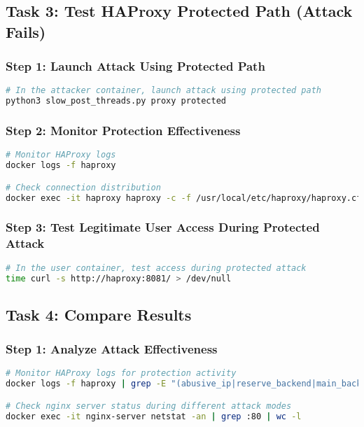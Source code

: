 \documentclass[12pt]{article}
\begin{document}
\subsection{Task 3: Test HAProxy Protected Path (Attack Fails)}

\subsubsection{Step 1: Launch Attack Using Protected Path}
\begin{lstlisting}[language=bash]
# In the attacker container, launch attack using protected path
python3 slow_post_threads.py proxy protected
\end{lstlisting}

\subsubsection{Step 2: Monitor Protection Effectiveness}
\begin{lstlisting}[language=bash]
# Monitor HAProxy logs
docker logs -f haproxy

# Check connection distribution
docker exec -it haproxy haproxy -c -f /usr/local/etc/haproxy/haproxy.cfg
\end{lstlisting}

\subsubsection{Step 3: Test Legitimate User Access During Protected Attack}
\begin{lstlisting}[language=bash]
# In the user container, test access during protected attack
time curl -s http://haproxy:8081/ > /dev/null
\end{lstlisting}

\subsection{Task 4: Compare Results}

\subsubsection{Step 1: Analyze Attack Effectiveness}
\begin{lstlisting}[language=bash]
# Monitor HAProxy logs for protection activity
docker logs -f haproxy | grep -E "(abusive_ip|reserve_backend|main_backend)"

# Check nginx server status during different attack modes
docker exec -it nginx-server netstat -an | grep :80 | wc -l
\end{lstlisting}
\end{document}
